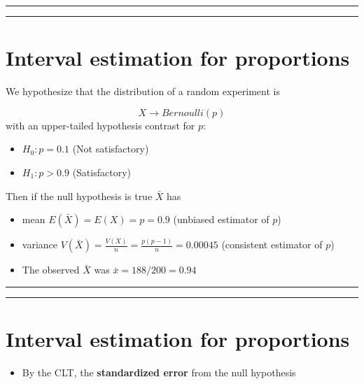 \documentclass[
]{book}
\providecommand{\tightlist}{%
  \setlength{\itemsep}{0pt}\setlength{\parskip}{0pt}}
\begin{document}
\begin{center}\rule{0.5\linewidth}{0.5pt}\end{center}

\begin{center}\rule{0.5\linewidth}{0.5pt}\end{center}

\hypertarget{interval-estimation-for-proportions-4}{%
\section{Interval estimation for proportions}\label{interval-estimation-for-proportions-4}}

We hypothesize that the distribution of a random experiment is

\[X \rightarrow Bernoulli (p)\]
with an upper-tailed hypothesis contrast for \(p\):

\begin{itemize}
\tightlist
\item
  \(H_0: p=0.1\) (Not satisfactory)
\item
  \(H_1: p> 0.9\) (Satisfactory)
\end{itemize}

Then if the null hypothesis is true \(\bar{X}\) has

\begin{itemize}
\item
  mean \(E(\bar{X})=E(X)=p=0.9\) (unbiased estimator of \(p\))\\
\item
  variance \(V(\bar{X})=\frac{V(X)}{n}=\frac{p(p-1)}{n}=0.00045\) (consistent estimator of \(p\))
\item
  The observed \(\bar{X}\) was \(\bar{x}=188/200=0.94\)
\end{itemize}

\begin{center}\rule{0.5\linewidth}{0.5pt}\end{center}

\begin{center}\rule{0.5\linewidth}{0.5pt}\end{center}

\hypertarget{interval-estimation-for-proportions-5}{%
\section{Interval estimation for proportions}\label{interval-estimation-for-proportions-5}}

\begin{itemize}
\tightlist
\item
  By the CLT, the \textbf{standardized error} from the null hypothesis
\end{itemize}
\end{document}
